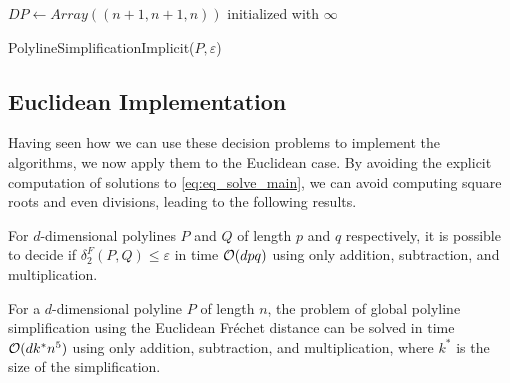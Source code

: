 \begin{algorithm}[ht]
  \DontPrintSemicolon
  \BlankLine
  \(DP \gets Array((n + 1, n + 1, n))\) initialized with \(\infty\) \;
  \caption{PolylineSimplificationImplicit(\(P, \varepsilon\))}
  \label{algo:simplify_simple_implicit}
\end{algorithm}


\subsection{Euclidean Implementation}\label{ssec:euclidean-impl}
Having seen how we can use these decision problems to implement the algorithms, we now apply them to the Euclidean case. By avoiding the explicit computation of solutions to \cref{eq:eq_solve_main}, we can avoid computing square roots and even divisions, leading to the following results.

\begin{theorem}
  For \(d\)-dimensional polylines \(P\) and \(Q\) of length \(p\) and \(q\) respectively, it is possible to decide if \(\delta_2^F(P, Q) \leq \varepsilon\) in time \(\mathcal{O}(d p q)\) using only addition, subtraction, and multiplication.
\end{theorem}

\begin{theorem}\label{thm:euclidean_implicit_simplification_simple}
  For a \(d\)-dimensional polyline \(P\) of length \(n\), the problem of global polyline simplification using the Euclidean Fréchet distance can be solved in time \(\mathcal{O}(d k^*n^5)\) using only addition, subtraction, and multiplication, where \(k^*\) is the size of the simplification.
\end{theorem}

